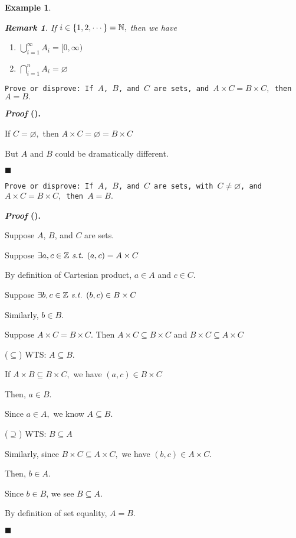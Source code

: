 \documentclass[12pt,a4paper]{article}
\newtheorem{eg}{Example}[subsection]
\newcounter{nprf}[subsection]
\newtheorem*{rmk}{\indent Remark}
\newenvironment*{prf}{\par\indent\textbf{\textit{Proof} (\stepcounter{nprf}\thenprf). }\par}{\par\hfill $\blacksquare$\par}
\def\Z{{\mathbb{Z}}}
\def\N{{\mathbb{N}}}
\def\emptyset{\varnothing}
\def\st{\emph{ s.t. }}
\begin{document}
\begin{eg}
\begin{enumerate}
\begin{enumerate}
		\end{enumerate}
		\begin{rmk}
			If $i\in\qty{1,2,\cdots}=\N,$ then we have
			\begin{enumerate}
			\item $\displaystyle\bigcup_{i=1}^\infty A_i=[0,\infty)$
			\item $\displaystyle\bigcap_{i=1}^n A_i=\emptyset$
			\end{enumerate}
		\end{rmk}
	\end{enumerate}
\end{eg}
\begin{framed}
\noindent\texttt{Prove or disprove: If $A$, $B$, and $C$ are sets, and $A\times C=B\times C,$ then $A=B.$}
\begin{prf}
	If $C=\emptyset,$ then $A\times C=\emptyset=B\times C$\par But $A$ and $B$ could be dramatically different.
\end{prf}
\end{framed}
\begin{framed}
\noindent\texttt{Prove or disprove: If $A$, $B$, and $C$ are sets, with $C\neq\emptyset$, and $A\times C=B\times C,$ then $A=B.$}
\begin{prf}
	Suppose $A$, $B$, and $C$ are sets.\par Suppose $\exists a,c\in\Z\st(a,c)=A\times C$\par By definition of Cartesian product, $a\in A$ and $c\in C.$\par Suppose $\exists b,c\in\Z\st (b,c)\in B\times C$\par Similarly, $b\in B.$\par Suppose $A\times C=B\times C.$ Then $A\times C\subseteq B\times C$ and $B\times C\subseteq A\times C$\par($\subseteq$) WTS: $A\subseteq B$.\par\hspace{5mm}If $A\times B\subseteq B\times C,$ we have $(a,c)\in B\times C$\par\hspace{5mm}Then, $a\in B.$\par\hspace{5mm}Since $a\in A,$ we know $A\subseteq B.$\par($\supseteq$) WTS: $B\subseteq A$\par\hspace{5mm}Similarly, since $B\times C\subseteq A\times C,$ we have $(b,c)\in A\times C.$\par\hspace{5mm}Then, $b\in A.$\par\hspace{5mm}Since $b\in B$, we see $B\subseteq A.$\par\hspace{5mm}By definition of set equality, $A=B.$
\end{prf}
\end{framed}
\end{document}
